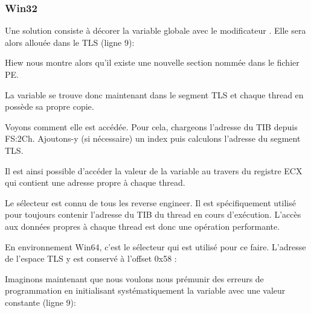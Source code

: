﻿\subsubsection{Win32}


Une solution consiste à décorer la variable globale avec le modificateur . 
Elle sera alors allouée dans le \ac{TLS} (ligne 9):



Hiew nous montre alors qu'il existe une nouvelle section nommée  dans le fichier PE.



La variable  se trouve donc maintenant dans le segment \ac{TLS} et chaque thread en 
possède sa propre copie.

Voyons comment elle est accédée. Pour cela, chargeons l'adresse du \ac{TIB} depuis FS:2Ch. 
Ajoutons-y (si nécessaire) un index puis calculons l'adresse du segment \ac{TLS}.

Il est ainsi possible d'accéder la valeur de la variable  au travers du registre 
ECX qui contient une adresse propre à chaque thread.


Le sélecteur  est connu de tous les reverse engineer. Il est spécifiquement utilisé pour 
toujours contenir l'adresse du \ac{TIB} du thread en cours d'exécution. L'accès aux données propres 
à chaque thread est donc une opération performante.


En environnement Win64, c'est le sélecteur  qui est utilisé pour ce faire. L'adresse de 
l'espace \ac{TLS} y est conservé à l'offset 0x58 :




Imaginons maintenant que nous voulons nous prémunir des erreurs de programmation en initialisant 
systématiquement la variable  avec une valeur constante (ligne 9):



